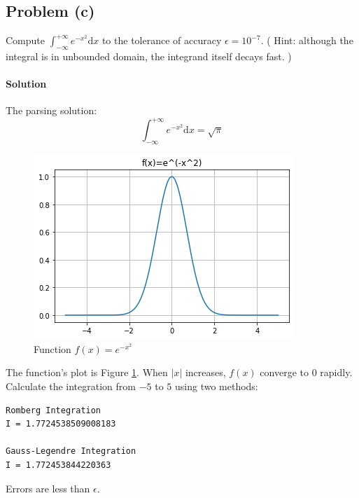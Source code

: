 \documentclass[UTF8,hyperref]{article}
\begin{document}
\subsection{Problem (c)}
\par Compute $\displaystyle{\int_{-\infty}^{+\infty}}{e^{-x^2}\mathrm{d}x}$ to the tolerance of accuracy $\epsilon =10^{-7}$. ( Hint: although the integral is in unbounded domain, the integrand itself decays fast. )
\paragraph{Solution} The parsing solution:
\begin{equation}
    \int_{-\infty}^{+\infty}{e^{-x^2}}\mathrm{d}x=\sqrt{\pi}
\end{equation}
\begin{figure}[htbp]
    \centering
    \includegraphics[scale=0.5]{img_results/pic10.png}
    \caption{Function $f(x)=e^{-x^2}$}
    \label{Fig4}
\end{figure}
\par The function's plot is Figure \ref{Fig4}. When $|x|$ increases, $f(x)$ converge to 0 rapidly. Calculate the integration from $-5$ to $5$ using two methods:
\begin{lstlisting}
Romberg Integration
I = 1.7724538509008183

Gauss-Legendre Integration
I = 1.772453844220363
\end{lstlisting}
\par Errors are less than $\epsilon$.
\end{document}

